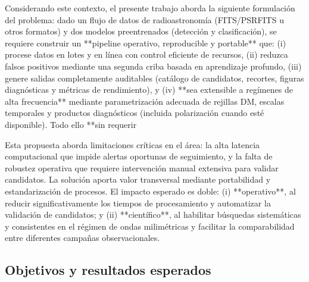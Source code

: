 \medskip


Considerando este contexto, el presente trabajo aborda la siguiente formulación del problema: dado un flujo de datos de radioastronomía (FITS/PSRFITS u otros formatos) y dos modelos preentrenados (detección y clasificación), se requiere construir un **pipeline operativo, reproducible y portable** que: (i) procese datos en lotes y en línea con control eficiente de recursos, (ii) reduzca falsos positivos mediante una segunda criba basada en aprendizaje profundo, (iii) genere salidas completamente auditables (catálogo de candidatos, recortes, figuras diagnósticas y métricas de rendimiento), y (iv) **sea extensible a regímenes de alta frecuencia** mediante parametrización adecuada de rejillas DM, escalas temporales y productos diagnósticos (incluida polarización cuando esté disponible). Todo ello **sin requerir 

\medskip

Esta propuesta aborda limitaciones críticas en el área: la alta latencia computacional que impide alertas oportunas de seguimiento, y la falta de robustez operativa que requiere intervención manual extensiva para validar candidatos. La solución aporta valor transversal mediante portabilidad y estandarización de procesos. El impacto esperado es doble: (i) **operativo**, al reducir significativamente los tiempos de procesamiento y automatizar la validación de candidatos; y (ii) **científico**, al habilitar búsquedas sistemáticas y consistentes en el régimen de ondas milimétricas y facilitar la comparabilidad entre diferentes campañas observacionales.


\subsection{Objetivos y resultados esperados}

